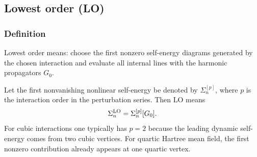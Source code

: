\subsection{Lowest order (LO)}
\subsubsection{Definition}
Lowest order means: choose the first nonzero self-energy diagrams generated by the chosen interaction and evaluate all internal lines with the harmonic propagators $G_0$.

Let the first nonvanishing nonlinear self-energy be denoted by $\Sigma_n^{[p]}$, where $p$ is the interaction order in the perturbation series. Then LO means
\begin{equation}
    \Sigma_n^{\rm LO} = \Sigma_n^{[p]}[G_0].
    \label{eq:LO_definition_precise}
\end{equation}
For cubic interactions one typically has $p=2$ because the leading dynamic self-energy comes from two cubic vertices. For quartic Hartree mean field, the first nonzero contribution already appears at one quartic vertex.

